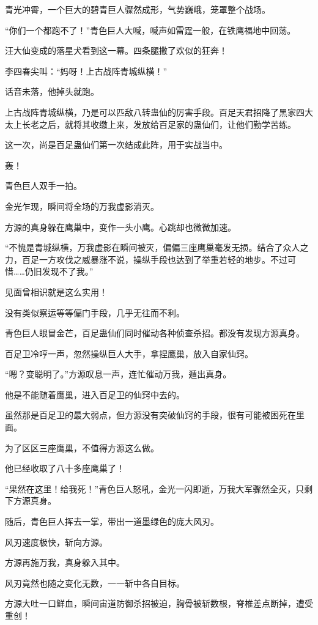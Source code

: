 \begin{this_body}
青光冲霄，一个巨大的碧青巨人骤然成形，气势巍峨，笼罩整个战场。

“你们一个都跑不了！”青色巨人大喊，喊声如雷霆一般，在铁鹰福地中回荡。

汪大仙变成的落星犬看到这一幕。四条腿撒了欢似的狂奔！

李四春尖叫：“妈呀！上古战阵青城纵横！”

话音未落，他掉头就跑。

上古战阵青城纵横，乃是可以匹敌八转蛊仙的厉害手段。百足天君招降了黑家四大太上长老之后，就将其收缴上来，发放给百足家的蛊仙们，让他们勤学苦练。

这一次，尚是百足蛊仙们第一次结成此阵，用于实战当中。

轰！

青色巨人双手一拍。

金光乍现，瞬间将全场的万我虚影消灭。

方源的真身躲在鹰巢中，变作一头小鹰。心跳却也微微加速。

“不愧是青城纵横，万我虚影在瞬间被灭，偏偏三座鹰巢毫发无损。结合了众人之力，百足一方攻伐之威暴涨不说，操纵手段也达到了举重若轻的地步。不过可惜……仍旧发现不了我。”

见面曾相识就是这么实用！

没有类似察运等等偏门手段，几乎无往而不利。

青色巨人眼冒金芒，百足蛊仙们同时催动各种侦查杀招。都没有发现方源真身。

百足卫冷哼一声，忽然操纵巨人大手，拿捏鹰巢，放入自家仙窍。

“嗯？变聪明了。”方源叹息一声，连忙催动万我，遁出真身。

他是不能随着鹰巢，进入百足卫的仙窍中去的。

虽然那是百足卫的最大弱点，但方源没有突破仙窍的手段，很有可能被困死在里面。

为了区区三座鹰巢，不值得方源这么做。

他已经收取了八十多座鹰巢了！

“果然在这里！给我死！”青色巨人怒吼，金光一闪即逝，万我大军骤然全灭，只剩下方源真身。

随后，青色巨人挥去一掌，带出一道墨绿色的庞大风刃。

风刃速度极快，斩向方源。

方源再施万我，真身躲入其中。

风刃竟然也随之变化无数，一一斩中各自目标。

方源大吐一口鲜血，瞬间宙道防御杀招被迫，胸骨被斩数根，脊椎差点断掉，遭受重创！


\end{this_body}
